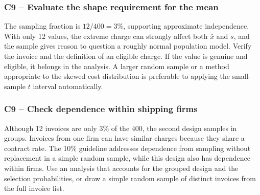 	\label{sol:c9-3-a}
	\subsubsection*{C9 -- Evaluate the shape requirement for the mean}

	The sampling fraction is $12/400=3\%$, supporting approximate independence. With only 12 values, the extreme charge can strongly affect both $\bar x$ and $s$, and the sample gives reason to question a roughly normal population model. Verify the invoice and the definition of an eligible charge. If the value is genuine and eligible, it belongs in the analysis. A larger random sample or a method appropriate to the skewed cost distribution is preferable to applying the small-sample $t$ interval automatically.


	\label{sol:c9-3-b}
	\subsubsection*{C9 -- Check dependence within shipping firms}

	Although 12 invoices are only 3\% of the 400, the second design samples in groups. Invoices from one firm can have similar charges because they share a contract rate. The 10\% guideline addresses dependence from sampling without replacement in a simple random sample, while this design also has dependence within firms. Use an analysis that accounts for the grouped design and the selection probabilities, or draw a simple random sample of distinct invoices from the full invoice list.




